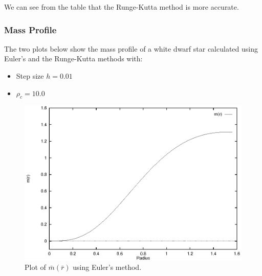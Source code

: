\documentclass[a4paper]{IEEEtran}
\begin{document}
    We can see from the table that the Runge-Kutta method is more
    accurate.

    \subsubsection{Mass Profile}
    The two plots below show the mass profile of a white dwarf star 
    calculated using Euler's and the Runge-Kutta methods with:
    \begin{itemize}
        \item Step size $h = 0.01$
        \item $\rho_c = 10.0$
    \end{itemize}

    \begin{figure}
    \caption{Plot of $\bar{m}(\bar{r})$ using Euler's method.} 
    \label{fig:mass-euler} 
    \begin{center}
        \includegraphics[width=\columnwidth]{figures/mass-euler-01}
    \end{center}
    \end{figure} 
\end{document}
